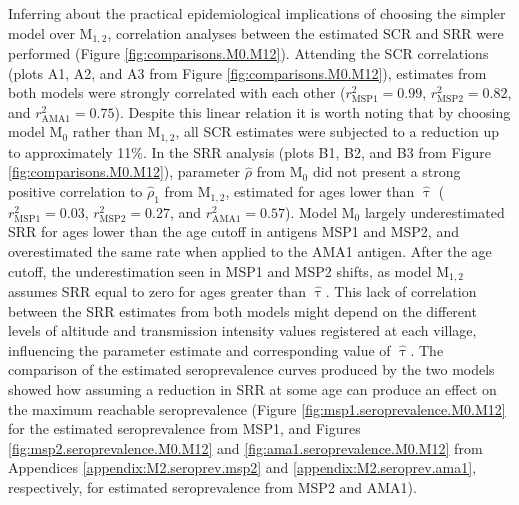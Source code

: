 Inferring about the practical epidemiological implications of choosing the simpler model over M$_{1,2}$, correlation analyses between the estimated SCR and SRR were performed (Figure \ref{fig:comparisons.M0.M12}).
Attending the SCR correlations (plots A1, A2, and A3 from Figure \ref{fig:comparisons.M0.M12}), estimates from both models were strongly correlated with each other ($r_{\text{MSP1}}^2=0.99$, $r_{\text{MSP2}}^2=0.82$, and $r_{\text{AMA1}}^2=0.75$).
Despite this linear relation it is worth noting that by choosing model M$_0$ rather than M$_{1,2}$, all SCR estimates were subjected to a reduction up to approximately 11\%.
In the SRR analysis (plots B1, B2, and B3 from Figure \ref{fig:comparisons.M0.M12}), parameter $ \widehat{\rho}$ from M$_0$ did not present a strong positive correlation to $ \widehat{\rho}_1$ from M$_{1,2}$, estimated for ages lower than $ \widehat{\uptau}$ ($r_{\text{MSP1}}^2=0.03$, $r_{\text{MSP2}}^2=0.27$, and $r_{\text{AMA1}}^2=0.57$).
Model M$_0$ largely underestimated SRR for ages lower than the age cutoff in antigens MSP1 and MSP2, and overestimated the same rate when applied to the AMA1 antigen.
After the age cutoff, the underestimation seen in MSP1 and MSP2 shifts, as model M$_{1,2}$ assumes SRR equal to zero for ages greater than $ \widehat{\uptau}$.
This lack of correlation between the SRR estimates from both models might depend on the different levels of altitude and transmission intensity values registered at each village, influencing the parameter estimate and corresponding value of $ \widehat{\uptau}$.
The comparison of the estimated seroprevalence curves produced by the two models showed how assuming a reduction in SRR at some age can produce an effect on the maximum reachable seroprevalence (Figure \ref{fig:msp1.seroprevalence.M0.M12} for the estimated seroprevalence from MSP1, and Figures \ref{fig:msp2.seroprevalence.M0.M12} and \ref{fig:ama1.seroprevalence.M0.M12} from Appendices \ref{appendix:M2.seroprev.msp2} and \ref{appendix:M2.seroprev.ama1}, respectively, for estimated seroprevalence from MSP2 and AMA1).


